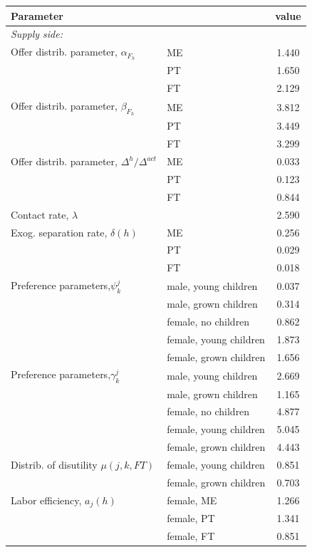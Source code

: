  \begin{tabular}{llc} \hline \hline
  Parameter  &     &  value \\ 
  \hline  
  \textit{Supply side:}  &     &   \\ 
Offer distrib. parameter, $\alpha_{F_{h}}$ &ME &       1.440 \\
							 &PT &       1.650 \\
							 &FT &       2.129 \\
Offer distrib. parameter, $\beta_{F_{h}}$ &ME &       3.812 \\
							 &PT &       3.449 \\
							 &FT &       3.299 \\
Offer distrib. parameter, $\Delta^h/\Delta^{act}$	 &ME &       0.033 \\
							 &PT &       0.123 \\
							 &FT &       0.844 \\
Contact rate, $\lambda$  &&       2.590 \\
Exog. separation rate, $\delta(h)$ &ME &       0.256 \\
						 &PT &       0.029 \\
						 &FT &       0.018 \\
Preference parameters,$\psi_k^j$ &male, young children &       0.037 \\
									 &male, grown children &       0.314 \\
									 &female, no children &       0.862 \\
									 &female, young children &       1.873 \\
									 &female, grown children &       1.656 \\
Preference parameters,$\gamma_k^j$ &male, young children &       2.669 \\
									 &male, grown children &       1.165 \\
									 &female, no children &       4.877 \\
									 &female, young children &       5.045 \\
									 &female, grown children &       4.443 \\
Distrib. of disutility $\mu(j,k,FT)$ &female, young children &       0.851 \\
								 &female, grown children &       0.703 \\
Labor efficiency, $a_j(h)$ &female, ME &       1.266 \\
						   &female, PT &       1.341 \\
						   &female, FT &       0.851 \\
   

\end{tabular}

